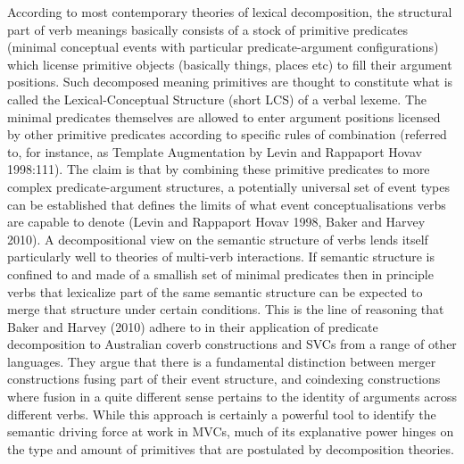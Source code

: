 According to most contemporary theories of lexical decomposition, the structural part of verb meanings basically consists of a stock of primitive predicates (minimal conceptual events with particular predicate-argument configurations) which license primitive objects (basically things, places etc) to fill their argument positions. Such decomposed meaning primitives are thought to constitute what is called the Lexical-Conceptual Structure (short \acs{LCS}) of a verbal lexeme. The minimal predicates themselves are allowed to enter argument positions licensed by other primitive predicates according to specific rules of combination (referred to, for instance, as Template Augmentation by Levin and Rappaport Hovav 1998:111). The claim is that by combining these primitive predicates to more complex predicate-argument structures, a potentially universal set of event types can be established that defines the limits of what event conceptualisations verbs are capable to denote (Levin and Rappaport Hovav 1998, Baker and Harvey 2010). A decompositional view on the semantic structure of verbs lends itself particularly well to theories of multi-verb interactions. If semantic structure is confined to and made of a smallish set of minimal predicates then in principle verbs that lexicalize part of the same semantic structure can be expected to merge that structure under certain conditions. This is the line of reasoning that Baker and Harvey (2010) adhere to in their application of predicate decomposition to Australian coverb constructions and SVCs from a range of other languages. They argue that there is a fundamental distinction between merger constructions fusing part of their event structure, and coindexing constructions where fusion in a quite different sense pertains to the identity of arguments across different verbs. While this approach is certainly a powerful tool to identify the semantic driving force at work in MVCs, much of its explanative power hinges on the type and amount of primitives that are postulated by decomposition theories.

